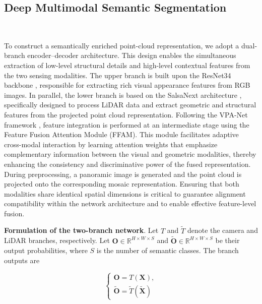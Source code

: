 \subsection{Deep Multimodal Semantic Segmentation}~\label{subsec:multi-modal-semantic-segmentation}

To construct a semantically enriched point-cloud representation, we adopt a dual-branch encoder--decoder architecture. This design enables the simultaneous extraction of low-level structural details and high-level contextual features from the two sensing modalities.
The upper branch is built upon the ResNet34 backbone \cite{he2015deepresiduallearningimage}, responsible for extracting rich visual appearance features from RGB images. In parallel, the lower branch is based on the SalsaNext architecture \cite{cortinhal2024salsanextfastuncertaintyawaresemantic}, specifically designed to process LiDAR data and extract geometric and structural features from the projected point cloud representation.
Following the VPA-Net framework \cite{Lin2025}, feature integration is performed at an intermediate stage using the Feature Fusion Attention Module (FFAM). This module facilitates adaptive cross-modal interaction by learning attention weights that emphasize complementary information between the visual and geometric modalities, thereby enhancing the consistency and discriminative power of the fused representation. \\

During preprocessing, a panoramic image is generated and the point cloud is projected onto the corresponding mosaic representation. Ensuring that both modalities share identical spatial dimensions is critical to guarantee alignment compatibility within the network architecture and to enable effective feature-level fusion.

\textbf{Formulation of the two-branch network}. Let $T$ and $\tilde{T}$ denote the camera and LiDAR branches, respectively. Let $\mathbf{O} \in \mathbb{R}^{H \times W \times S}$ and $\mathbf{\tilde{O}} \in \mathbb{R}^{H \times W \times S}$ be their output probabilities, where $S$ is the number of semantic classes. The branch outputs are

\begin{equation}
	\begin{cases}
		\mathbf{O} = T(\mathbf{X}), \\
	    \mathbf{\tilde{O}} = \tilde{T}(\mathbf{\tilde{X}})
	\end{cases}
\end{equation}

